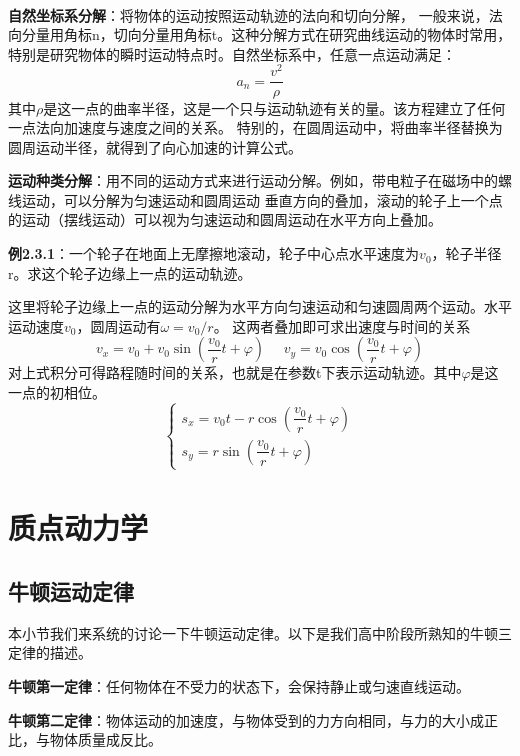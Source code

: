 \documentclass{article}
\begin{document}
    \ 

    \textbf{自然坐标系分解}：将物体的运动按照运动轨迹的法向和切向分解，
    一般来说，法向分量用角标n，切向分量用角标t。这种分解方式在研究曲线运动的物体时常用，
    特别是研究物体的瞬时运动特点时。自然坐标系中，任意一点运动满足：
    \begin{equation*}
        a_n = \frac{v^2}{\rho}
    \end{equation*}
    其中\(\rho\)是这一点的曲率半径，这是一个只与运动轨迹有关的量。该方程建立了任何一点法向加速度与速度之间的关系。
    特别的，在圆周运动中，将曲率半径替换为圆周运动半径，就得到了向心加速的计算公式。
    
    \textbf{运动种类分解}：用不同的运动方式来进行运动分解。例如，带电粒子在磁场中的螺线运动，可以分解为匀速运动和圆周运动
    垂直方向的叠加，滚动的轮子上一个点的运动（摆线运动）可以视为匀速运动和圆周运动在水平方向上叠加。

    \textbf{例2.3.1}：一个轮子在地面上无摩擦地滚动，轮子中心点水平速度为\(v_0\)，轮子半径r。求这个轮子边缘上一点的运动轨迹。

    这里将轮子边缘上一点的运动分解为水平方向匀速运动和匀速圆周两个运动。水平运动速度\(v_0\)，圆周运动有\(\omega = v_0/r\)。
    这两者叠加即可求出速度与时间的关系
    \begin{equation*}
        v_x = v_0 + v_0 \sin(\frac{v_0}{r}t + \varphi) \ \ \ \ \ \ v_y = v_0 \cos(\frac{v_0}{r}t + \varphi)
    \end{equation*}
    对上式积分可得路程随时间的关系，也就是在参数t下表示运动轨迹。其中\(\varphi\)是这一点的初相位。
    \[
    \begin{cases}
        s_x = v_0 t - r \cos(\dfrac{v_0}{r}t + \varphi) \\
        s_y = r \sin(\dfrac{v_0}{r}t + \varphi)
    \end{cases}
    \]
    
\section{质点动力学}

\subsection{牛顿运动定律}
    本小节我们来系统的讨论一下牛顿运动定律。以下是我们高中阶段所熟知的牛顿三定律的描述。

    \textbf{牛顿第一定律}：任何物体在不受力的状态下，会保持静止或匀速直线运动。

    \textbf{牛顿第二定律}：物体运动的加速度，与物体受到的力方向相同，与力的大小成正比，与物体质量成反比。
\end{document}
